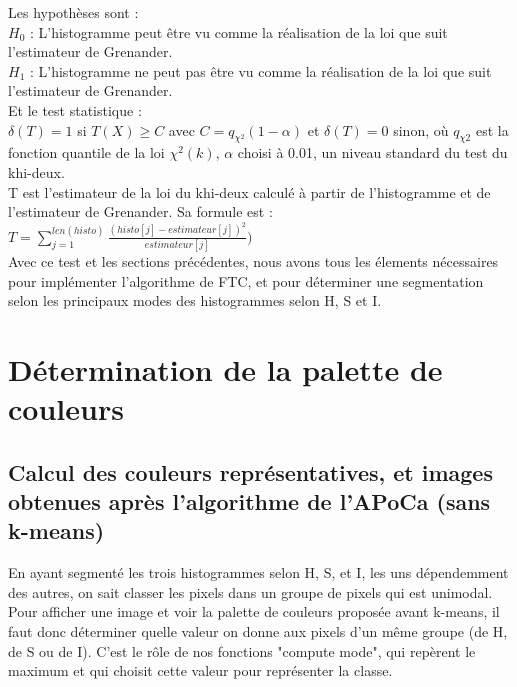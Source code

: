 \documentclass{article}
\begin{document}
Les hypothèses sont : \\

$H_0$ : L'histogramme peut être vu comme la réalisation de la loi que suit l'estimateur de Grenander.\\

$H_1$ : L'histogramme ne peut pas être vu comme la réalisation de la loi que suit l'estimateur de Grenander.\\

Et le test statistique :\\

$\delta(T) = 1$ si $T(X) \geq C $ avec $C = q_{\chi^{2}}(1-{\alpha})$ et $\delta(T) = 0$ sinon, 
où $q_{\chi2}$ est la fonction quantile de la loi ${\chi}^{2}(k)$, ${\alpha}$ choisi à 0.01, un niveau standard du test du khi-deux.\\

T est l'estimateur de la loi du khi-deux calculé à partir de l'histogramme et de l'estimateur de Grenander. Sa formule est :\\

$T = \sum \limits _{j=1} ^{len(histo)}\frac {(histo[j]-estimateur[j])^2}{estimateur[j]})$ \\

Avec ce test et les sections précédentes, nous avons tous les élements nécessaires pour implémenter l'algorithme de FTC, et pour déterminer une segmentation selon les principaux modes des histogrammes selon H, S et I.\\

\section{Détermination de la palette de couleurs}

\subsection{Calcul des couleurs représentatives, et images obtenues après l'algorithme de l'APoCa (sans k-means)}

En ayant segmenté les trois histogrammes selon H, S, et I, les uns dépendemment des autres, on sait classer les pixels dans un groupe de pixels qui est unimodal. Pour afficher une image et voir la palette de couleurs proposée avant k-means, il faut donc déterminer quelle valeur on donne aux pixels d'un même groupe (de H, de S ou de I). C'est le rôle de nos fonctions "compute mode", qui repèrent le maximum et qui choisit cette valeur pour représenter la classe.\\
\end{document}
